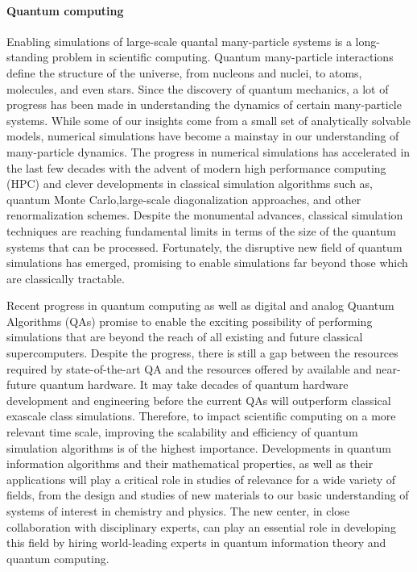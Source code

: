\documentclass[a4paper,10pt]{article}
\begin{document}
\paragraph{Quantum computing} Enabling simulations of large-scale quantal many-particle systems is a long-standing problem in scientific computing. Quantum many-particle interactions define the structure of the universe, from nucleons and nuclei, to atoms, molecules, and even stars. Since the discovery of quantum mechanics, a lot of progress has been made in understanding the dynamics of certain many-particle systems. While some of our insights come from a small set of analytically solvable models, numerical simulations have become a mainstay in our understanding of many-particle dynamics. The progress in numerical simulations has accelerated in the last few decades with the advent of modern high performance computing (HPC) and clever developments in classical simulation algorithms such as, quantum Monte Carlo,large-scale diagonalization approaches, and other renormalization schemes. Despite the monumental advances, classical simulation techniques are reaching fundamental limits in terms of the size of the quantum systems that can be processed. Fortunately, the disruptive new field of quantum simulations has emerged, promising to enable simulations far beyond those which are classically tractable. 

Recent progress in quantum computing as well as digital and analog Quantum Algorithms (QAs) promise to enable the exciting possibility of performing simulations that are beyond the reach of all existing and future classical supercomputers. Despite the progress, there is still a gap between the resources required by state-of-the-art QA and the resources offered by available and near-future quantum hardware. It may take decades of quantum hardware development and engineering before the current QAs will outperform classical exascale class simulations. Therefore, to impact scientific computing on a more relevant time scale, improving the scalability and efficiency of quantum simulation algorithms is of the highest importance. Developments in quantum information algorithms and their mathematical properties, as well as their applications will play a critical role in studies of relevance for a wide variety of fields, from the design and studies of new materials to our basic understanding of systems of interest in chemistry and physics. The new center, in close collaboration with disciplinary experts, can play an essential role in developing this field by hiring world-leading experts in quantum information theory and quantum computing.
\end{document}
